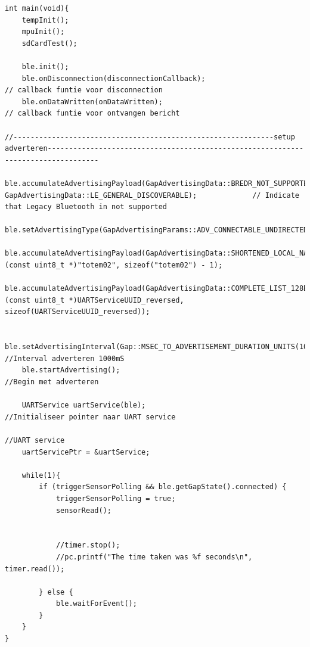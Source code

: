 \documentclass[12pt,a4paper]{report}
\begin{document}
\begin{lstlisting}
int main(void){
    tempInit();
    mpuInit();
    sdCardTest();
    
    ble.init();
    ble.onDisconnection(disconnectionCallback);                                            // callback funtie voor disconnection
    ble.onDataWritten(onDataWritten);                                                      // callback funtie voor ontvangen bericht

//-------------------------------------------------------------setup adverteren----------------------------------------------------------------------------------
    ble.accumulateAdvertisingPayload(GapAdvertisingData::BREDR_NOT_SUPPORTED| GapAdvertisingData::LE_GENERAL_DISCOVERABLE);             // Indicate that Legacy Bluetooth in not supported
    ble.setAdvertisingType(GapAdvertisingParams::ADV_CONNECTABLE_UNDIRECTED);
    ble.accumulateAdvertisingPayload(GapAdvertisingData::SHORTENED_LOCAL_NAME, (const uint8_t *)"totem02", sizeof("totem02") - 1);
    ble.accumulateAdvertisingPayload(GapAdvertisingData::COMPLETE_LIST_128BIT_SERVICE_IDS, (const uint8_t *)UARTServiceUUID_reversed, sizeof(UARTServiceUUID_reversed));

    ble.setAdvertisingInterval(Gap::MSEC_TO_ADVERTISEMENT_DURATION_UNITS(1000));            //Interval adverteren 1000mS
    ble.startAdvertising();                                                                 //Begin met adverteren

    UARTService uartService(ble);                                                           //Initialiseer pointer naar UART service
                                                                                            //UART service
    uartServicePtr = &uartService;  
         
    while(1){
        if (triggerSensorPolling && ble.getGapState().connected) {
            triggerSensorPolling = true;
            sensorRead();
            
            
            //timer.stop();
            //pc.printf("The time taken was %f seconds\n", timer.read());

        } else {
            ble.waitForEvent();
        }
    }    
}
\end{lstlisting}
\end{document}
